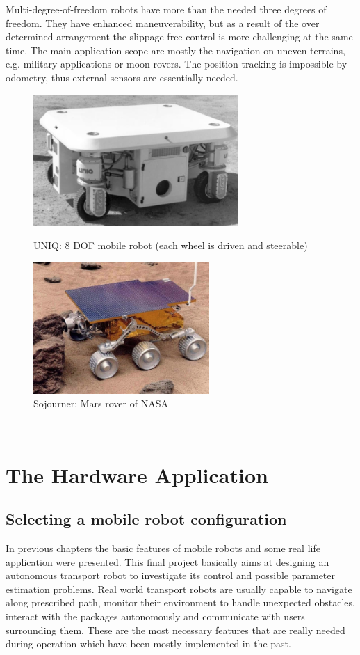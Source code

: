 \documentclass[12pt,english,twoside]{article}
\begin{document}
Multi-degree-of-freedom robots have more than the needed three degrees of freedom. They have enhanced maneuverability, but as a result of the over determined arrangement the slippage free control is more challenging at the same time. The main application scope are mostly the navigation on uneven terrains, e.g. military applications or moon rovers. The position tracking is impossible by odometry, thus external sensors are essentially needed. 

\begin{figure}[htb!]
	\centering
	\centering
	\includegraphics[height=5cm]{figures/uniq.png}
	\caption{UNIQ: 8 DOF mobile robot (each wheel is driven and steerable) \cite{rirt}}
	\endminipage\hfill
	\centering
	\includegraphics[height=5cm]{figures/rover.png}
	\caption{Sojourner: Mars rover of NASA \cite{rirt}}
	\label{mecanum}
	\endminipage\hfill
\end{figure}
\newpage
\thispagestyle{empty}
$~$
\newpage
\section{The Hardware Application}
\subsection{Selecting a mobile robot configuration}
In previous chapters the basic features of mobile robots and some real life application were presented. This final project basically aims at designing an autonomous transport robot to investigate its control and possible parameter estimation problems. Real world transport robots are usually capable to navigate along prescribed path, monitor their environment to handle unexpected obstacles, interact with the packages autonomously and communicate with users surrounding them. These are the most necessary features that are really needed during operation which have been mostly implemented in the past.
\end{document}
